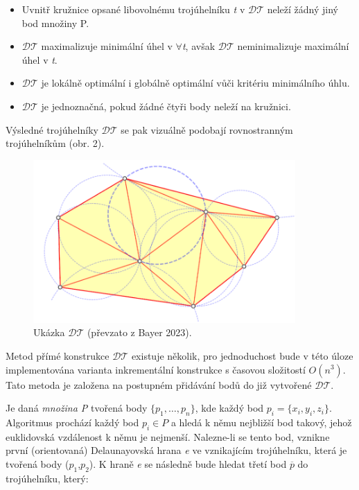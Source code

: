 \begin{itemize}
  \item Uvnitř kružnice opsané libovolnému trojúhelníku \emph{t} v $\mathcal{DT}$ neleží žádný jiný bod množiny P. 
  \item $\mathcal{DT}$ maximalizuje minimální úhel v $\forall$\emph{t}, avšak $\mathcal{DT}$ neminimalizuje maximální úhel v \emph{t}.
  \item $\mathcal{DT}$ je lokálně optimální i globálně optimální vůči kritériu minimálního úhlu.
  \item $\mathcal{DT}$ je jednoznačná, pokud žádné čtyři body neleží na kružnici. 
\end{itemize}

\par Výsledné trojúhelníky $\mathcal{DT}$ se pak vizuálně podobají rovnostranným trojúhelníkům (obr. 2).
\begin{figure}[H]
\centering
\includegraphics[width=10cm]{images/dt.png} 
    \caption{Ukázka $\mathcal{DT}$ (převzato z Bayer 2023).}
\end{figure}

\par Metod přímé konstrukce $\mathcal{DT}$ existuje několik, pro jednoduchost bude v této úloze implementována varianta inkrementální konstrukce s časovou složitostí $O(n^3)$. Tato metoda je založena na postupném přidávání bodů do již vytvořené $\mathcal{DT}$. 

\par Je daná \emph {množina P} tvořená body $\{p_1, \dots, p_n\}$, kde každý bod $p_i = \{x_i, y_i, z_i\}$. Algoritmus prochází každý bod $p_i \in P$ a hledá k němu nejbližší bod takový, jehož euklidovská vzdálenost k němu je nejmenší. Nalezne-li se tento bod, vznikne první (orientovaná) Delaunayovská hrana \emph{e} ve vznikajícím trojúhelníku, která je tvořená body ($p_1$,$p_2$). K hraně \emph{e} se následně bude hledat třetí bod $\overline{p}$ do trojúhelníku, který:

